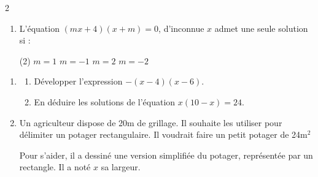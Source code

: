\documentclass[10pt,a4paper]{article}
\begin{document}
\begin{multicols}{2}
\begin{exo}[QCM][appro]
\begin{enumerate}

        La seule formule possible pour \(g\) est 

        \hspace{-1cm}\begin{minipage}{0.5\textwidth}
        \begin{tasks}(2)
            \task \(g(x)  (x+3)(2x-2)\)
            \task \(g(x)  (3x-1)^2\)
            \task \(g(x)  x^3-3x^2-3x-3\)
            \task \(g(x)  x^3-2x^2-2x-3\)
        \end{tasks}
        \end{minipage} \vspace{0.1cm}

        \item L'équation \((mx+4)(x+m)=0\), d'inconnue \(x\) admet une seule solution si :\begin{tasks}(2)
            \task \(m=1\)
            \task \(m=-1\)
            \task \(m=2\)
            \task \(m=-2\)
        \end{tasks}
    \end{enumerate}
\end{exo}

\begin{exo}[][appro]
    \begin{enumerate}
        \item \begin{enumerate}
        \item Développer l'expression \(-(x-4)(x-6)\). 
        \item En déduire les solutions de l'équation \(x(10-x) = 24\).
        \end{enumerate}
    \item Un agriculteur dispose de 20m de grillage. Il souhaite les utiliser pour délimiter un potager rectangulaire. Il voudrait faire un petit potager de 24m$^2$

    Pour s'aider, il a dessiné une version simplifiée du potager, représentée par un rectangle. Il a noté \(x\) sa largeur. \medbreak

\end{enumerate}
\end{exo}
\end{multicols}
\end{document}

